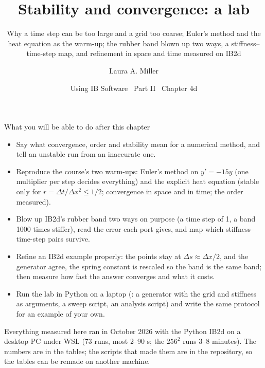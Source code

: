 \documentclass[aspectratio=169,11pt]{beamer}
\title[IB2d: stability and convergence lab]{Stability and convergence: a lab}
\subtitle{Why a time step can be too large and a grid too coarse; Euler's method and the heat equation as the warm-up; the rubber band blown up two ways, a stiffness--time-step map, and refinement in space and time measured on IB2d}
\author[Miller]{Laura A. Miller}
\institute[UArizona]{Department of Mathematics, University of Arizona}
\date{Using IB Software \textbullet\ Part II \textbullet\ Chapter 4d}
\begin{document}
\begin{frame}[plain]
\end{frame}

\begin{frame}{What you will be able to do after this chapter}
\label{fr:goals}
\footnotesize
\begin{itemize}
  \item Say what convergence, order and stability mean for a numerical method, and tell an unstable run from an inaccurate one.
  \item Reproduce the course's two warm-ups: Euler's method on $y' = -15y$ (one multiplier per step decides everything) and the explicit heat equation (stable only for $r = \Delta t/\Delta x^2 \le 1/2$; convergence in space and in time; the order measured).
  \item Blow up IB2d's rubber band two ways on purpose (a time step of 1, a band 1000 times stiffer), read the error each port gives, and map which stiffness--time-step pairs survive.
  \item Refine an IB2d example properly: the points stay at $\Delta s \approx \Delta x/2$,  and the generator agree, the spring constant is rescaled so the band is the same band; then measure how fast the answer converges and what it costs.
  \item Run the lab in Python on a laptop (: a generator with the grid and stiffness as arguments, a sweep script, an analysis script) and write the same protocol for an example of your own.
\end{itemize}
\begin{punchbox}
\small Everything measured here ran in October 2026 with the Python IB2d on a desktop PC under WSL (73 runs, most 2--90 s; the $256^2$ runs 3--8 minutes). The numbers are in the tables; the scripts that made them are in the repository, so the tables can be remade on another machine.
\end{punchbox}
\end{frame}
\end{document}
